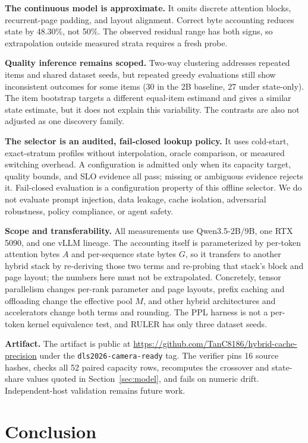 \documentclass[conference,letterpaper,10pt]{IEEEtran}
\begin{document}
\textbf{The continuous model is approximate.}
It omits discrete attention blocks, recurrent-page padding, and layout
alignment. Correct byte accounting reduces state by 48.30\%, not 50\%. The
observed residual range has both signs, so extrapolation outside measured
strata requires a fresh probe.

\textbf{Quality inference remains scoped.}
Two-way clustering addresses repeated items and shared dataset seeds, but
repeated greedy evaluations still show inconsistent outcomes for some items
(30 in the 2B baseline, 27 under state-only). The item bootstrap targets a
different equal-item estimand and gives a similar state estimate, but it does
not explain this variability. The contrasts are also not adjusted as one
discovery family.

\textbf{The selector is an audited, fail-closed lookup policy.}
It uses cold-start, exact-stratum profiles without interpolation, oracle
comparison, or measured switching overhead. A configuration is admitted only
when its capacity target, quality bounds, and SLO evidence all pass; missing or
ambiguous evidence rejects it. Fail-closed evaluation is a configuration
property of this offline selector. We do not evaluate prompt injection, data
leakage, cache isolation, adversarial robustness, policy compliance, or agent
safety.

\textbf{Scope and transferability.}
All measurements use Qwen3.5-2B/9B, one RTX 5090, and one vLLM lineage. The
accounting itself is parameterized by per-token attention bytes $A$ and
per-sequence state bytes $G$, so it transfers to another hybrid stack by
re-deriving those two terms and re-probing that stack's block and page layout;
the numbers here must not be extrapolated. Concretely, tensor parallelism
changes per-rank parameter and page layouts, prefix caching and offloading
change the effective pool $M$, and other hybrid architectures and accelerators
change both terms and rounding. The PPL harness is not a per-token kernel
equivalence test, and RULER has only three dataset seeds.

\textbf{Artifact.}
The artifact is public at
\url{https://github.com/TanC8186/hybrid-cache-precision} under the
\texttt{dls2026-camera-ready} tag. The verifier pins 16 source hashes, checks
all 52 paired capacity rows, recomputes the crossover and state-share values
quoted in Section~\ref{sec:model}, and fails on numeric drift. Independent-host
validation remains future work.

\section{Conclusion}
\label{sec:conclusion}
\end{document}
